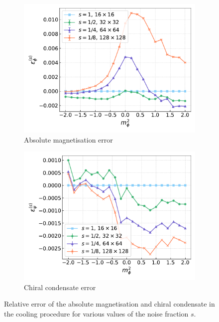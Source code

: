 \begin{figure}[htp]
    \centering
    \begin{subfigure}[b]{0.47\textwidth}
        \includegraphics[width=1.0\textwidth]{figures/cooling/mass_scan/deviation.pdf}
        \caption{Absolute magnetisation error}
    \end{subfigure}
    \begin{subfigure}[b]{0.47\textwidth}
        \includegraphics[width=1.0\textwidth]{figures/cooling/mass_scan/deviation_cond.pdf}
        \caption{Chiral condensate error}
    \end{subfigure}
    \caption[Relative error in the cooling procedure at tree level.]{Relative error of the absolute magnetisation and chiral condensate in the cooling procedure for various values of the noise fraction $s$.}
    \label{fig:cooling_deviation}
\end{figure}
